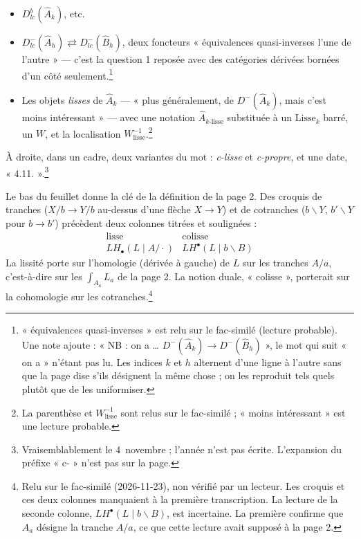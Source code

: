 \documentclass[11pt,a4paper]{article}
\begin{document}
\begin{itemize}
\item[A)] $D^{b}_{lc}(\hat{A}_{k})$, etc.
\item[B)] $D^{-}_{lc}(\hat{A}_{h}) \rightleftarrows D^{-}_{lc}(\hat{B}_{h})$,
deux foncteurs « équivalences quasi-inverses l'une de l'autre » --- c'est la
question 1 reposée avec des catégories dérivées bornées d'un côté
seulement.\footnote{« équivalences quasi-inverses » est relu sur le fac-similé
(lecture probable). Une note ajoute : « NB : on a \ldots{}
$D^{-}(\hat{A}_{k}) \to D^{-}(\hat{B}_{h})$ », le mot qui suit « on a »
n'étant pas lu. Les indices $k$ et $h$ alternent d'une ligne à l'autre sans que
la page dise s'ils désignent la même chose ; on les reproduit tels quels plutôt
que de les uniformiser.}
\item[C)] Les objets \emph{lisses} de $\hat{A}_{k}$ --- « plus généralement, de
$D^{-}(\hat{A}_{k})$, mais c'est moins intéressant » --- avec une notation
$\hat{A}_{k\text{-lisse}}$ substituée à un $\mathrm{Lisse}_{k}$ barré, un $W$, et
la localisation $W^{-1}_{\mathrm{lisse}}$.\footnote{La parenthèse et
$W^{-1}_{\mathrm{lisse}}$ sont relus sur le fac-similé ; « moins intéressant »
est une lecture probable.}
\end{itemize}

À droite, dans un cadre, deux variantes du mot : \emph{c-lisse} et
\emph{c-propre}, et une date, « 4.11. ».\footnote{Vraisemblablement le
4~novembre ; l'année n'est pas écrite. L'expansion du préfixe « c- » n'est pas
sur la page.}

Le bas du feuillet donne la clé de la définition de la page 2. Des croquis de
tranches ($X/b \to Y/b$ au-dessus d'une flèche $X \to Y$) et de cotranches
($b \backslash Y$, $b' \backslash Y$ pour $b \to b'$) précèdent deux colonnes
titrées et soulignées :
\[
\begin{array}{ll}
\text{lisse} & \text{colisse} \\
LH_{\bullet}(L \mid A/\cdot) & LH^{\bullet}(L \mid b\backslash B)
\end{array}
\]
La lissité porte sur l'homologie (dérivée à gauche) de $L$ sur les tranches
$A/a$, c'est-à-dire sur les $\int_{A_{a}} L_{a}$ de la page 2. La notion duale,
« colisse », porterait sur la cohomologie sur les
cotranches.\footnote{Relu sur le fac-similé (2026-11-23), non vérifié par un
lecteur. Les croquis et ces deux colonnes manquaient à la première
transcription. La lecture de la seconde colonne, $LH^{\bullet}(L \mid
b\backslash B)$, est incertaine. La première confirme que $A_{a}$ désigne la
tranche $A/a$, ce que cette lecture avait supposé à la page 2.}
\end{document}
